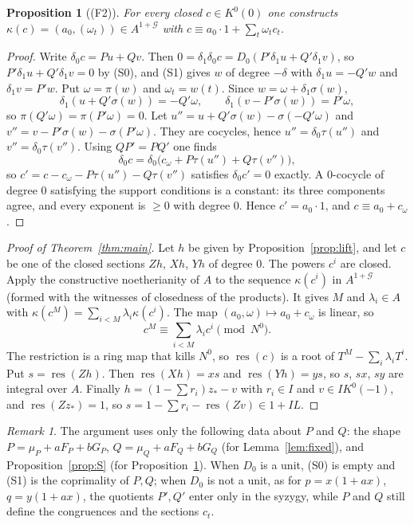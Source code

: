 \documentclass[11pt]{amsart}
\newtheorem{proposition}[theorem]{Proposition}
\theoremstyle{definition}
\theoremstyle{remark}
\newtheorem{remark}[theorem]{Remark}
\DeclareMathOperator{\res}{res}
\begin{document}
\begin{proposition}[(F2)]\label{prop:F2}
For every closed $c\in K^0(0)$ one constructs $\kappa(c)=(a_0,(\omega_t))\in
A^{1+\mathcal G}$ with $c\equiv a_0\cdot1+\sum_t\omega_tc_t$.
\end{proposition}
\begin{proof}
Write $\delta_0c=Pu+Qv$. Then
$0=\delta_1\delta_0c=D_0(P'\delta_1u+Q'\delta_1v)$, so
$P'\delta_1u+Q'\delta_1v=0$ by (S0), and (S1) gives $w$ of degree
$-\delta$ with $\delta_1u=-Q'w$ and $\delta_1v=P'w$. Put
$\omega=\pi(w)$ and $\omega_t=w(t)$. Since $w=\omega+\delta_1\sigma(w)$,
\[
 \delta_1(u+Q'\sigma(w))=-Q'\omega,\qquad \delta_1(v-P'\sigma(w))=P'\omega ,
\]
so $\pi(Q'\omega)=\pi(P'\omega)=0$. Let $u''=u+Q'\sigma(w)-\sigma(-Q'\omega)$
and $v''=v-P'\sigma(w)-\sigma(P'\omega)$. They are cocycles, hence
$u''=\delta_0\tau(u'')$ and $v''=\delta_0\tau(v'')$. Using $QP'=PQ'$ one
finds
\[
 \delta_0c=\delta_0\big(c_\omega+P\tau(u'')+Q\tau(v'')\big),
\]
so $c'=c-c_\omega-P\tau(u'')-Q\tau(v'')$ satisfies $\delta_0c'=0$ exactly.
A $0$-cocycle of degree $0$ satisfying the support conditions is a
constant: its three components agree, and every exponent is $\ge0$ with
degree $0$. Hence $c'=a_0\cdot1$, and $c\equiv a_0+c_\omega$.
\end{proof}

\begin{proof}[Proof of Theorem~\ref{thm:main}]
Let $h$ be given by Proposition~\ref{prop:lift}, and let $c$ be one of the
closed sections $Zh$, $Xh$, $Yh$ of degree $0$. The powers $c^i$ are
closed. Apply the constructive noetherianity of $A$ to the sequence
$\kappa(c^i)$ in $A^{1+\mathcal G}$ (formed with the witnesses of
closedness of the products). It gives $M$ and $\lambda_i\in A$ with
$\kappa(c^M)=\sum_{i<M}\lambda_i\kappa(c^i)$. The map
$(a_0,\omega)\mapsto a_0+c_\omega$ is linear, so
\[
 c^M\equiv\sum_{i<M}\lambda_ic^i\pmod{N^0}.
\]
The restriction is a ring map that kills $N^0$, so $\res(c)$ is a root of
$T^M-\sum_i\lambda_iT^i$. Put $s=\res(Zh)$. Then $\res(Xh)=xs$ and
$\res(Yh)=ys$, so $s$, $sx$, $sy$ are integral over $A$. Finally
$h=(1-\sum r_i)z_*-v$ with $r_i\in I$ and $v\in IK^0(-1)$, and
$\res(Zz_*)=1$, so $s=1-\sum r_i-\res(Zv)\in1+IL$.
\end{proof}

\begin{remark}
The argument uses only the following data about $P$ and $Q$: the shape
$P=\mu_P+aF_P+bG_P$, $Q=\mu_Q+aF_Q+bG_Q$ (for Lemma~\ref{lem:fixed}), and
Proposition~\ref{prop:S} (for Proposition~\ref{prop:F2}). When $D_0$ is a
unit, (S0) is empty and (S1) is the coprimality of $P,Q$; when $D_0$ is not
a unit, as for $p=x(1+ax)$, $q=y(1+ax)$, the quotients $P',Q'$ enter only in
the syzygy, while $P$ and $Q$ still define the congruences and the
sections $c_t$.
\end{remark}
\end{document}
